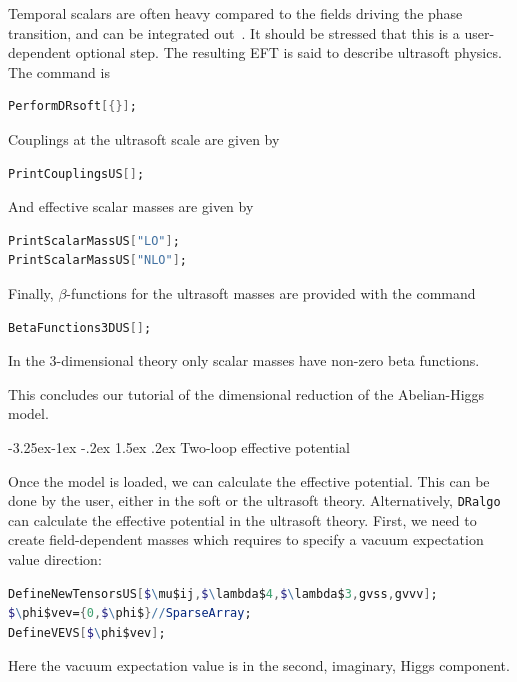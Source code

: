 \documentclass[11pt]{article}
\makeatletter
\def\dralgo{{\tt DRalgo}}
\newcommand{\vev}{vacuum expectation value}
\renewcommand\subsection{\@startsection{subsection}{2}{\z@}%
  {-3.25ex\@plus -1ex \@minus -.2ex}%
  {1.5ex \@plus .2ex}%
  {\normalfont\normalsize\bfseries}}
\makeatother
\begin{document}
Temporal scalars are often heavy compared to the fields driving the phase transition, and can be integrated out~\cite{Kajantie:1995dw,Farakos:1994kx}.
It should be stressed that this is a user-dependent  optional step.
The resulting EFT is said to describe ultrasoft physics.
The command is
\begin{lstlisting}[language=Mathematica,mathescape=true]
PerformDRsoft[{}];
\end{lstlisting}
Couplings at the ultrasoft scale are given by
\begin{lstlisting}[language=Mathematica,mathescape=true]
PrintCouplingsUS[];
\end{lstlisting}
And effective scalar masses are given by
\begin{lstlisting}[language=Mathematica,mathescape=true]
PrintScalarMassUS["LO"];
PrintScalarMassUS["NLO"];
\end{lstlisting}
%
Finally, $\beta$-functions for the ultrasoft masses are provided with the command
\begin{lstlisting}[language=Mathematica,mathescape=true]
BetaFunctions3DUS[];
\end{lstlisting}
In the 3-dimensional theory only scalar masses have non-zero beta functions.

This concludes our tutorial of
the dimensional reduction of the Abelian-Higgs model.


%
\subsection{Two-loop effective potential}

Once the model is loaded, we can calculate the effective potential.
This can be done by the user, either in the soft or the ultrasoft theory.
Alternatively,
\dralgo{} can calculate the effective potential in the ultrasoft theory. 
%
First, we need to create field-dependent masses
which requires to specify a \vev{} direction:
\begin{lstlisting}[language=Mathematica,mathescape=true]
DefineNewTensorsUS[$\mu$ij,$\lambda$4,$\lambda$3,gvss,gvvv];
$\phi$vev={0,$\phi$}//SparseArray;
DefineVEVS[$\phi$vev];
\end{lstlisting}
Here the \vev{} is in the second, imaginary, Higgs component.
\end{document}
